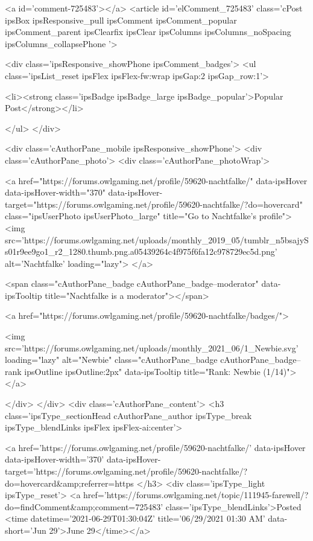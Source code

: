 <a id='comment-725483'></a>
<article  id='elComment_725483' class='cPost ipsBox ipsResponsive_pull  ipsComment ipsComment_popular ipsComment_parent ipsClearfix ipsClear ipsColumns ipsColumns_noSpacing ipsColumns_collapsePhone    '>
	

	
		<div class='ipsResponsive_showPhone ipsComment_badges'>
			<ul class='ipsList_reset ipsFlex ipsFlex-fw:wrap ipsGap:2 ipsGap_row:1'>
				
				
				
				
					<li><strong class='ipsBadge ipsBadge_large ipsBadge_popular'>Popular Post</strong></li>
				
			</ul>
		</div>
	

	<div class='cAuthorPane_mobile ipsResponsive_showPhone'>
		<div class='cAuthorPane_photo'>
			<div class='cAuthorPane_photoWrap'>
				


	<a href="https://forums.owlgaming.net/profile/59620-nachtfalke/" data-ipsHover data-ipsHover-width="370" data-ipsHover-target="https://forums.owlgaming.net/profile/59620-nachtfalke/?do=hovercard" class="ipsUserPhoto ipsUserPhoto_large" title="Go to Nachtfalke's profile">
		<img src='https://forums.owlgaming.net/uploads/monthly_2019_05/tumblr_n5bsajySs01r9ee9go1_r2_1280.thumb.png.a05439264c4f975f6fa12c978729ec5d.png' alt='Nachtfalke' loading="lazy">
	</a>

				
				<span class="cAuthorPane_badge cAuthorPane_badge--moderator" data-ipsTooltip title="Nachtfalke is a moderator"></span>
				
				
					<a href="https://forums.owlgaming.net/profile/59620-nachtfalke/badges/">
						
<img src='https://forums.owlgaming.net/uploads/monthly_2021_06/1_Newbie.svg' loading="lazy" alt="Newbie" class="cAuthorPane_badge cAuthorPane_badge--rank ipsOutline ipsOutline:2px" data-ipsTooltip title="Rank: Newbie (1/14)">
					</a>
				
			</div>
		</div>
		<div class='cAuthorPane_content'>
			<h3 class='ipsType_sectionHead cAuthorPane_author ipsType_break ipsType_blendLinks ipsFlex ipsFlex-ai:center'>
				


<a href='https://forums.owlgaming.net/profile/59620-nachtfalke/' data-ipsHover data-ipsHover-width='370' data-ipsHover-target='https://forums.owlgaming.net/profile/59620-nachtfalke/?do=hovercard&amp;referrer=https%
			</h3>
			<div class='ipsType_light ipsType_reset'>
				<a href='https://forums.owlgaming.net/topic/111945-farewell/?do=findComment&amp;comment=725483' class='ipsType_blendLinks'>Posted <time datetime='2021-06-29T01:30:04Z' title='06/29/2021 01:30  AM' data-short='Jun 29'>June 29</time></a>
				
